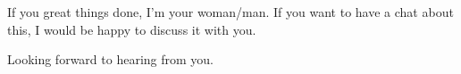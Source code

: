 If you great things done, I'm your woman/man.
If you want to have a chat about this, I would be happy to discuss it with you.


Looking forward to hearing from you.

